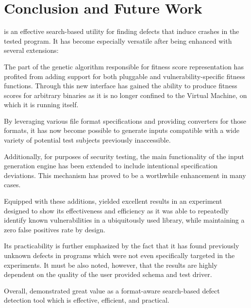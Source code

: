 \section{Conclusion and Future Work}
\label{sec:conclusion}
\xmlmate is an effective search-based utility for finding defects that induce crashes in the tested program. It
has become especially versatile after being enhanced with several extensions:

The part of the genetic algorithm responsible for fitness score representation has profited from adding
support for both pluggable and vulnerability-specific fitness functions. Through this new interface \xmlmate
has gained the ability to produce fitness scores for arbitrary binaries as it is no longer confined to
the \java Virtual Machine, on which it is running itself. 

By leveraging various file format specifications and
providing converters for those formats, it has now become possible to generate inputs compatible with a wide
variety of potential test subjects previously inaccessible. 

Additionally, for purposes of security testing, the main
functionality of the input generation engine has been extended to include intentional specification deviations.
This mechanism has proved to be a worthwhile enhancement in many cases.

Equipped with these additions, \xmlmate yielded excellent results in an experiment designed to show its
effectiveness and efficiency as it was able to repeatedly identify known vulnerabilities in a ubiquitously
used library, while maintaining a zero false positives rate by design.

Its practicability is further emphasized by the fact that it has found previously unknown defects in programs
which were not even specifically targeted in the experiments. 
It must be also noted, however, that the results are highly dependent on the quality of the user provided
schema and test driver.

\begin{mdframed}
Overall, \xmlmate demonstrated great value as a format-aware search-based defect detection tool which
is effective, efficient, and practical.
\end{mdframed}